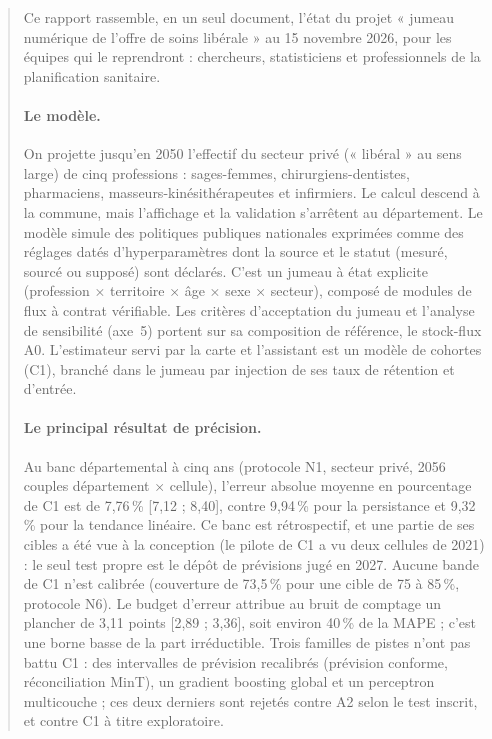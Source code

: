 \begin{abstract}
Ce rapport rassemble, en un seul document, l'état du projet « jumeau numérique de l'offre de soins libérale » au
15 novembre 2026, pour les équipes qui le reprendront : chercheurs, statisticiens et professionnels de la
planification sanitaire.

\paragraph{Le modèle.} On projette jusqu'en 2050 l'effectif du secteur privé (« libéral » au sens large) de cinq
professions : sages-femmes, chirurgiens-dentistes, pharmaciens, masseurs-kinésithérapeutes et infirmiers. Le
calcul descend à la commune, mais l'affichage et la validation s'arrêtent au département. Le modèle simule des
politiques publiques nationales exprimées comme des réglages datés d'hyperparamètres dont la source et le statut
(mesuré, sourcé ou supposé) sont déclarés. C'est un jumeau à état explicite (profession × territoire × âge × sexe ×
secteur), composé de modules de flux à contrat vérifiable. Les critères d'acceptation du jumeau et l'analyse de
sensibilité (axe~5) portent sur sa composition de référence, le stock-flux A0. L'estimateur servi par la carte et
l'assistant est un modèle de cohortes (C1), branché dans le jumeau par injection de ses taux de rétention et
d'entrée.

\paragraph{Le principal résultat de précision.} Au banc départemental à cinq ans (protocole N1, secteur privé,
\num{2056} couples département × cellule), l'erreur absolue moyenne en pourcentage de C1 est de
7,76\,\%\mesure{} [7,12 ; 8,40], contre 9,94\,\%\mesure{} pour la persistance et 9,32\,\%\mesure{} pour la
tendance linéaire. Ce banc est rétrospectif, et une partie de ses cibles a été vue à la conception (le pilote de
C1 a vu deux cellules de 2021) : le seul test propre est le dépôt de prévisions jugé en 2027. Aucune bande de C1
n'est calibrée (couverture de 73,5\,\%\mesure{} pour une cible de 75 à 85\,\%, protocole N6). Le budget d'erreur
attribue au bruit de comptage un plancher de 3,11 points\derive{} [2,89 ; 3,36], soit environ 40\,\%\derive{} de
la MAPE ; c'est une borne basse de la part irréductible. Trois familles de pistes n'ont pas battu C1 : des
intervalles de prévision recalibrés (prévision conforme, réconciliation MinT), un gradient boosting global et un
perceptron multicouche ; ces deux derniers sont rejetés contre A2 selon le test inscrit, et contre C1 à titre
exploratoire.


\end{abstract}
